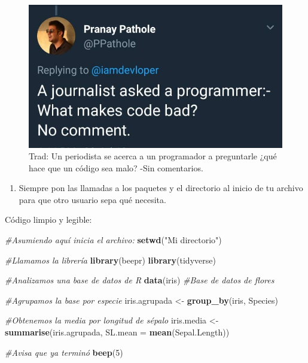 \documentclass[
]{book}
\newenvironment{Shaded}{\begin{snugshade}}{\end{snugshade}}
\newcommand{\CommentTok}[1]{\textcolor[rgb]{0.56,0.35,0.01}{\textit{#1}}}
\newcommand{\DataTypeTok}[1]{\textcolor[rgb]{0.13,0.29,0.53}{#1}}
\newcommand{\DecValTok}[1]{\textcolor[rgb]{0.00,0.00,0.81}{#1}}
\newcommand{\KeywordTok}[1]{\textcolor[rgb]{0.13,0.29,0.53}{\textbf{#1}}}
\newcommand{\NormalTok}[1]{#1}
\newcommand{\StringTok}[1]{\textcolor[rgb]{0.31,0.60,0.02}{#1}}
\providecommand{\tightlist}{%
  \setlength{\itemsep}{0pt}\setlength{\parskip}{0pt}}
\begin{document}
\begin{figure}

{\centering \includegraphics[width=10in]{images/tweet1} 

}

\caption{Trad: Un periodista se acerca a un programador a preguntarle ¿qué hace que un código sea malo? -Sin comentarios.}\label{fig:unnamed-chunk-88}
\end{figure}

\begin{enumerate}
\def\labelenumi{\arabic{enumi}.}
\setcounter{enumi}{6}
\tightlist
\item
  Siempre pon las llamadas a los paquetes y el directorio al inicio de tu archivo para que otro usuario sepa qué necesita.
\end{enumerate}

Código limpio y legible:

\begin{Shaded}
\begin{Highlighting}[]
\CommentTok{#Asumiendo aquí inicia el archivo:}
\KeywordTok{setwd}\NormalTok{(}\StringTok{"Mi directorio"}\NormalTok{)}

\CommentTok{#Llamamos la librería}
\KeywordTok{library}\NormalTok{(beepr)}
\KeywordTok{library}\NormalTok{(tidyverse)}

\CommentTok{#Analizamos una base de datos de R}
\KeywordTok{data}\NormalTok{(iris) }\CommentTok{#Base de datos de flores}

\CommentTok{#Agrupamos la base por especie}
\NormalTok{iris.agrupada <-}\StringTok{ }\KeywordTok{group_by}\NormalTok{(iris, Species)}

\CommentTok{#Obtenemos la media por longitud de sépalo}
\NormalTok{iris.media    <-}\StringTok{ }\KeywordTok{summarise}\NormalTok{(iris.agrupada, }\DataTypeTok{SL.mean =} \KeywordTok{mean}\NormalTok{(Sepal.Length))}

\CommentTok{#Avisa que ya terminó}
\KeywordTok{beep}\NormalTok{(}\DecValTok{5}\NormalTok{)}
\end{Highlighting}
\end{Shaded}
\end{document}

